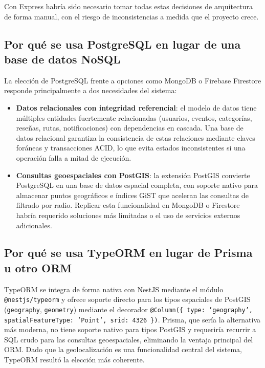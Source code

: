 Con Express habría sido necesario tomar todas estas decisiones de arquitectura de forma manual, con el riesgo de inconsistencias a medida que el proyecto crece.

\subsection{Por qué se usa PostgreSQL en lugar de una base de datos NoSQL}

La elección de PostgreSQL frente a opciones como MongoDB o Firebase Firestore responde principalmente a dos necesidades del sistema:

\begin{itemize}
    \item \textbf{Datos relacionales con integridad referencial}: el modelo de datos tiene múltiples entidades fuertemente relacionadas (usuarios, eventos, categorías, reseñas, rutas, notificaciones) con dependencias en cascada. Una base de datos relacional garantiza la consistencia de estas relaciones mediante claves foráneas y transacciones ACID, lo que evita estados inconsistentes si una operación falla a mitad de ejecución.
    \item \textbf{Consultas geoespaciales con PostGIS}: la extensión PostGIS convierte PostgreSQL en una base de datos espacial completa, con soporte nativo para almacenar puntos geográficos e índices GiST que aceleran las consultas de filtrado por radio. Replicar esta funcionalidad en MongoDB o Firestore habría requerido soluciones más limitadas o el uso de servicios externos adicionales.
\end{itemize}

\subsection{Por qué se usa TypeORM en lugar de Prisma u otro ORM}

TypeORM se integra de forma nativa con NestJS mediante el módulo \texttt{@nestjs/typeorm} y ofrece soporte directo para los tipos espaciales de PostGIS (\texttt{geography}, \texttt{geometry}) mediante el decorador \texttt{@Column(\{ type: 'geography', spatialFeatureType: 'Point', srid: 4326 \})}. Prisma, que sería la alternativa más moderna, no tiene soporte nativo para tipos PostGIS y requeriría recurrir a SQL crudo para las consultas geoespaciales, eliminando la ventaja principal del ORM. Dado que la geolocalización es una funcionalidad central del sistema, TypeORM resultó la elección más coherente.

